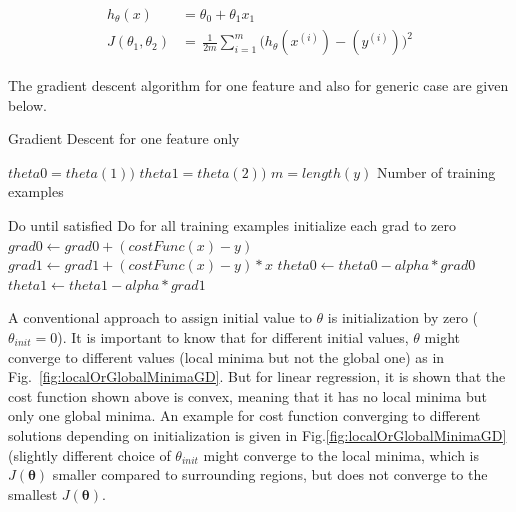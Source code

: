\begin{align}
\label{eqn:linearRegressionTwoFeaturesSummary}
\begin{split}
h_{\theta}(x) & = \theta_0 + \theta_1 x_1 
\\
J(\theta_1,\theta_2)
 & =\,
\frac{1}{2m} \sum\limits_{i=1}^{m} \Big(h_\theta(x^{(i)}) - (y^{(i)})\Big)^2  
\end{split}
\end{align}

The gradient descent algorithm for one feature and also for generic case are given below. 

 \begin{algorithm}
   \caption{Gradient Descent for one feature only}
    \begin{algorithmic}[1]
      

        \State $theta0 = theta(1))$  
        \State $theta1 = theta(2))$  
        \State $m = length(y)$ \Comment Number of training examples

         \Comment Do until satisfied
                     \Comment Do for all training examples
                         \State initialize each grad to zero
           	 	\State $grad0 \leftarrow grad0 + (costFunc(x) - y)$
		         \State $grad1 \leftarrow grad1 + (costFunc(x) - y) * x$
                    \EndFor
                    \State $theta0 \leftarrow theta0 - alpha * grad0$
                    \State $theta1 \leftarrow theta1 - alpha * grad1$
        \EndFor
       \EndFunction

\end{algorithmic}
\end{algorithm}
 
A conventional approach to assign initial value to $\theta$ is initialization by zero ($\theta_{init} = 0$).
It is important to know that for different initial values, $\theta$ might converge to different values (local minima but not the global one) as in Fig.~\ref{fig:localOrGlobalMinimaGD}. 
But for linear regression, it is shown that the cost function shown above is convex, meaning that it has no local minima but only one global minima. An example for cost function converging to different solutions depending on initialization is given in Fig.\ref{fig:localOrGlobalMinimaGD} (slightly different choice of $\theta_{init}$ might converge to the local minima, which is $J(\bm{\theta})$ smaller compared to surrounding regions, but does not converge to the smallest $J(\bm{\theta})$.

